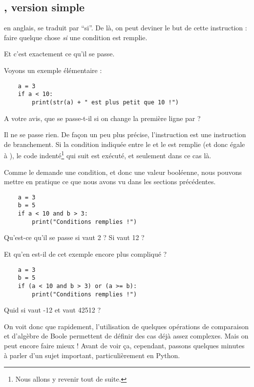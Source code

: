 \subsection{, version simple}

 en anglais, se traduit par ``si''. De là, on peut deviner le but de cette instruction : faire quelque chose \emph{si} une condition est remplie.

Et c'est exactement ce qu'il se passe.

Voyons un exemple élémentaire :

\begin{lstlisting}
    a = 3
    if a < 10:
        print(str(a) + " est plus petit que 10 !")
\end{lstlisting}

A votre avis, que se passe-t-il si on change la première ligne par  ?

Il ne se passe rien. De façon un peu plus précise, l'instruction  est une instruction de branchement. Si la condition indiquée entre le  et le \codeintext{:} est remplie (et donc égale à ), le code indenté\footnote{Nous allons y revenir tout de suite.} qui suit est exécuté, et seulement dans ce cas là.

Comme le  demande une condition, et donc une valeur booléenne, nous pouvons mettre en pratique ce que nous avons vu dans les sections précédentes.

\begin{lstlisting}
    a = 3
    b = 5
    if a < 10 and b > 3:
        print("Conditions remplies !")
\end{lstlisting}

Qu'est-ce qu'il se passe si  vaut 2 ? Si  vaut 12 ?

Et qu'en est-il de cet exemple encore plus compliqué ?

\begin{lstlisting}
    a = 3
    b = 5
    if (a < 10 and b > 3) or (a >= b):
        print("Conditions remplies !")
\end{lstlisting}

Quid si  vaut -12 et  vaut 42512 ?

On voit donc que rapidement, l'utilisation de quelques opérations de comparaison et d'algèbre de Boole permettent de définir des cas déjà assez complexes. Mais on peut encore faire mieux ! Avant de voir ça, cependant, passons quelques minutes à parler d'un sujet important, particulièrement en Python.

